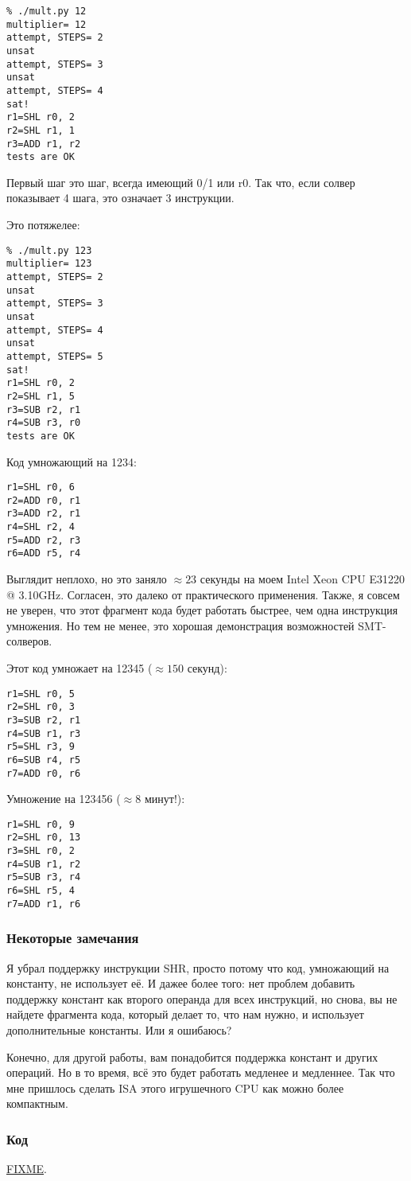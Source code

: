 \begin{lstlisting}
% ./mult.py 12
multiplier= 12
attempt, STEPS= 2
unsat
attempt, STEPS= 3
unsat
attempt, STEPS= 4
sat!
r1=SHL r0, 2
r2=SHL r1, 1
r3=ADD r1, r2
tests are OK
\end{lstlisting}

Первый шаг это шаг, всегда имеющий 0/1 или r0.
Так что, если солвер показывает 4 шага, это означает 3 инструкции.

Это потяжелее:

\begin{lstlisting}
% ./mult.py 123
multiplier= 123
attempt, STEPS= 2
unsat
attempt, STEPS= 3
unsat
attempt, STEPS= 4
unsat
attempt, STEPS= 5
sat!
r1=SHL r0, 2
r2=SHL r1, 5
r3=SUB r2, r1
r4=SUB r3, r0
tests are OK
\end{lstlisting}

Код умножающий на 1234:

\begin{lstlisting}
r1=SHL r0, 6
r2=ADD r0, r1
r3=ADD r2, r1
r4=SHL r2, 4
r5=ADD r2, r3
r6=ADD r5, r4
\end{lstlisting}

Выглядит неплохо, но это заняло $\approx 23$ секунды на моем Intel Xeon CPU E31220 @ 3.10GHz.
Согласен, это далеко от практического применения.
Также, я совсем не уверен, что этот фрагмент кода будет работать быстрее, чем одна инструкция умножения.
Но тем не менее, это хорошая демонстрация возможностей SMT-солверов.

Этот код умножает на 12345 ($\approx 150$ секунд):

\begin{lstlisting}
r1=SHL r0, 5
r2=SHL r0, 3
r3=SUB r2, r1
r4=SUB r1, r3
r5=SHL r3, 9
r6=SUB r4, r5
r7=ADD r0, r6
\end{lstlisting}

Умножение на 123456 ($\approx 8$ минут!):

\begin{lstlisting}
r1=SHL r0, 9
r2=SHL r0, 13
r3=SHL r0, 2
r4=SUB r1, r2
r5=SUB r3, r4
r6=SHL r5, 4
r7=ADD r1, r6
\end{lstlisting}

\subsubsection{Некоторые замечания}

Я убрал поддержку инструкции SHR, просто потому что код, умножающий на константу, не использует её.
И дажее более того: нет проблем добавить поддержку констант как второго операнда для всех инструкций,
но снова, вы не найдете фрагмента кода, который делает то, что нам нужно, и использует дополнительные константы.
Или я ошибаюсь?

Конечно, для другой работы, вам понадобится поддержка констант и других операций.
Но в то время, всё это будет работать медленее и медленнее.
Так что мне пришлось сделать \ac{ISA} этого игрушечного \ac{CPU} как можно более компактным.

\subsubsection{Код}

\url{FIXME}.


